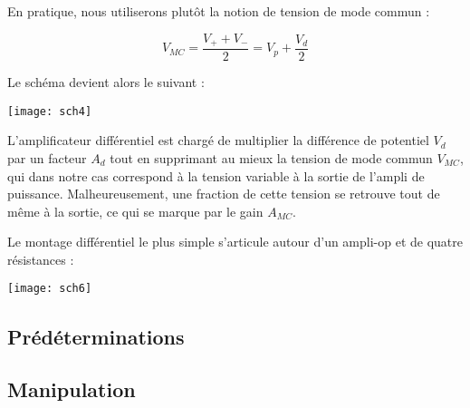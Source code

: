 \documentclass{../template/labo}
\begin{document}
En pratique, nous utiliserons plutôt la notion de tension de mode commun :

$$V_{MC}=\frac{V_+ + V_-}{2} = V_p + \frac{V_d}{2}$$

Le schéma devient alors le suivant :

\begin{center}
\texttt{[image: sch4]}
\end{center}

L'amplificateur différentiel est chargé de multiplier la différence de potentiel $V_d$ par un facteur $A_d$ tout
en supprimant au mieux la tension de mode commun $V_{MC}$, qui dans notre cas correspond à la tension
variable à la sortie de l'ampli de puissance.
Malheureusement, une fraction de cette tension se retrouve tout de même à la sortie, ce qui se marque
par le gain $A_{MC}$.

Le montage différentiel le plus simple s'articule autour d'un ampli-op et de quatre résistances :

\begin{center}
\texttt{[image: sch6]}
\end{center}

\subsection{Prédéterminations}

{}

{}


\subsection{Manipulation}
{}

\end{document}

